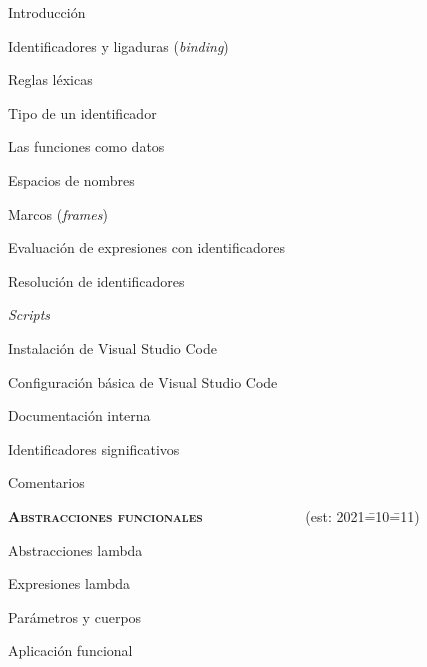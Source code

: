 \begin{longenum}
\begin{longenum}
\begin{longenum}
            \item Introducción
            \item Identificadores y ligaduras (\textit{binding})
            \begin{longenum}
                \item Reglas léxicas
                \item Tipo de un identificador
                \item Las funciones como datos
            \end{longenum}
            \item Espacios de nombres
            \item Marcos (\textit{frames})
            \item Evaluación de expresiones con identificadores
            \begin{longenum}
                \item Resolución de identificadores
            \end{longenum}
            \item \textit{Scripts}
            \item Instalación de Visual Studio Code
            \begin{longenum}
                \item Configuración básica de Visual Studio Code
            \end{longenum}
        \end{longenum}
        \item Documentación interna
        \begin{longenum}
            \item Identificadores significativos
            \item Comentarios
        \end{longenum}
    \end{longenum}
    \item \textbf{\textsc{Abstracciones funcionales}} \ \ \ \ \ \ \ \ \ \ \ \ \ \ (est: 2021\==10\==11)
    \begin{longenum}
        \item Abstracciones lambda
        \begin{longenum}
            \item Expresiones lambda
            \item Parámetros y cuerpos
            \item Aplicación funcional

\end{longenum}
\end{longenum}
\end{longenum}
